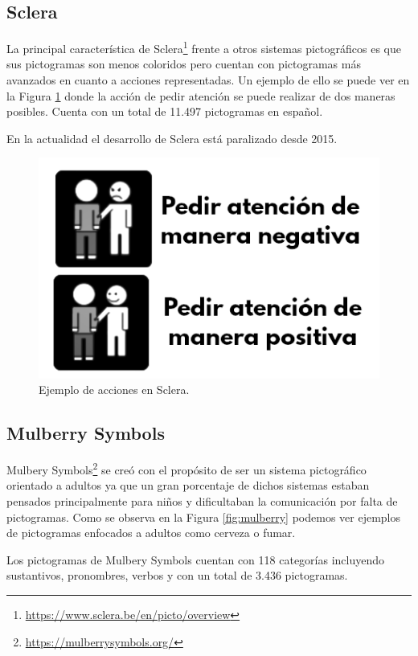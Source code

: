 \subsection{Sclera}
La principal característica de Sclera\footnote{\url{https://www.sclera.be/en/picto/overview}} frente a otros sistemas pictográficos es que sus pictogramas son menos coloridos pero cuentan con pictogramas más avanzados en cuanto a acciones representadas. Un ejemplo de ello se puede ver en la Figura \ref{fig:sclera} donde la acción de pedir atención se puede realizar de dos maneras posibles. Cuenta con un total de 11.497 pictogramas en español.

En la actualidad el desarrollo de Sclera está paralizado desde 2015.



\begin{figure}[h!]
	\centering
	\includegraphics[scale=0.5]{Imagenes/Bitmap/Sclera}
	\caption{Ejemplo de acciones en Sclera.}
	\label{fig:sclera}
\end{figure}

\newpage
\subsection{Mulberry Symbols}
Mulbery Symbols\footnote{\url{https://mulberrysymbols.org/}} se creó con el propósito de ser un sistema pictográfico orientado a adultos ya que un gran porcentaje de dichos sistemas estaban pensados principalmente para niños y dificultaban la comunicación por falta de pictogramas. Como se observa en la Figura \ref{fig:mulberry} podemos ver ejemplos de pictogramas enfocados a adultos como cerveza o fumar.

Los pictogramas de Mulbery Symbols cuentan con 118 categorías incluyendo sustantivos, pronombres, verbos y con un total de 3.436 pictogramas.



